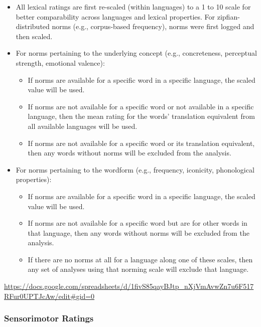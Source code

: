 \documentclass[
  man,floatsintext]{apa6}
\begin{document}
\begin{itemize}
\item
  All lexical ratings are first re-scaled (within languages) to a 1 to 10 scale for better comparability across languages and lexical properties. For zipfian-distributed norms (e.g., corpus-based frequency), norms were first logged and then scaled.
\item
  For norms pertaining to the underlying concept (e.g., concreteness, perceptual strength, emotional valence):

  \begin{itemize}
  \item
    If norms are available for a specific word in a specific language, the scaled value will be used.
  \item
    If norms are not available for a specific word or not available in a specific language, then the mean rating for the words' translation equivalent from all available languages will be used.
  \item
    If norms are not available for a specific word or its translation equivalent, then any words without norms will be excluded from the analysis.
  \end{itemize}
\item
  For norms pertaining to the wordform (e.g., frequency, iconicity, phonological properties):

  \begin{itemize}
  \item
    If norms are available for a specific word in a specific language, the scaled value will be used.
  \item
    If norms are not available for a specific word but are for other words in that language, then any words without norms will be excluded from the analysis.
  \item
    If there are no norms at all for a language along one of these scales, then any set of analyses using that norming scale will exclude that language.
  \end{itemize}
\end{itemize}

\url{https://docs.google.com/spreadsheets/d/1fivS85qayBJtp_nXjVmAvwZn7u6F517RFur0UPTJcAw/edit\#gid=0}

\subsubsection{Sensorimotor Ratings}\label{sensorimotor-ratings}
\end{document}
